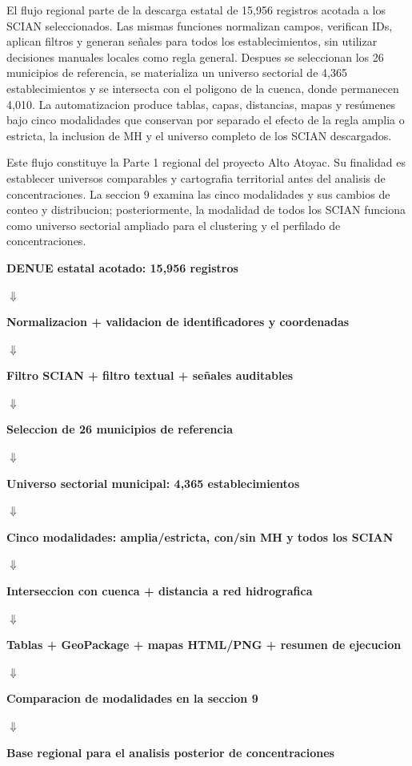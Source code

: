 \documentclass[11pt,letterpaper]{article}
\begin{document}
El flujo regional parte de la descarga estatal de 15,956 registros acotada a los SCIAN seleccionados. Las mismas funciones normalizan campos, verifican IDs, aplican filtros y generan señales para todos los establecimientos, sin utilizar decisiones manuales locales como regla general. Despues se seleccionan los 26 municipios de referencia, se materializa un universo sectorial de 4,365 establecimientos y se intersecta con el poligono de la cuenca, donde permanecen 4,010. La automatizacion produce tablas, capas, distancias, mapas y resúmenes bajo cinco modalidades que conservan por separado el efecto de la regla amplia o estricta, la inclusion de MH y el universo completo de los SCIAN descargados.

Este flujo constituye la Parte 1 regional del proyecto Alto Atoyac. Su finalidad es establecer universos comparables y cartografia territorial antes del analisis de concentraciones. La seccion 9 examina las cinco modalidades y sus cambios de conteo y distribucion; posteriormente, la modalidad de todos los SCIAN funciona como universo sectorial ampliado para el clustering y el perfilado de concentraciones.

\begin{center}
\begin{tcolorbox}[
  width=0.92\textwidth,
  colback=blue!2,
  colframe=AtoyacGreen,
  title={Diagrama 2. Flujo automatico de la Parte 1 regional},
  fonttitle=\bfseries
]
\centering
\textbf{DENUE estatal acotado: 15,956 registros}\par
$\Downarrow$\par
\textbf{Normalizacion + validacion de identificadores y coordenadas}\par
$\Downarrow$\par
\textbf{Filtro SCIAN + filtro textual + señales auditables}\par
$\Downarrow$\par
\textbf{Seleccion de 26 municipios de referencia}\par
$\Downarrow$\par
\textbf{Universo sectorial municipal: 4,365 establecimientos}\par
$\Downarrow$\par
\textbf{Cinco modalidades: amplia/estricta, con/sin MH y todos los SCIAN}\par
$\Downarrow$\par
\textbf{Interseccion con cuenca + distancia a red hidrografica}\par
$\Downarrow$\par
\textbf{Tablas + GeoPackage + mapas HTML/PNG + resumen de ejecucion}\par
$\Downarrow$\par
\textbf{Comparacion de modalidades en la seccion 9}\par
$\Downarrow$\par
\textbf{Base regional para el analisis posterior de concentraciones}
\end{tcolorbox}
\end{center}
\end{document}
